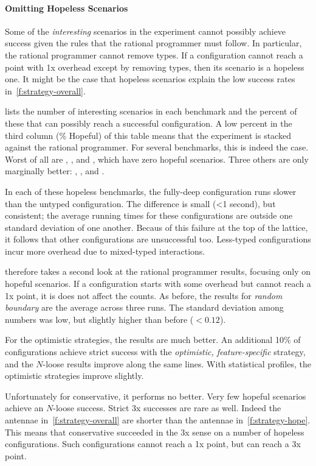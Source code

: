 \paragraph{Omitting Hopeless Scenarios}

Some of the \emph{interesting} scenarios in the experiment cannot possibly
achieve success given the rules that the rational programmer must follow.
In particular, the rational programmer cannot remove types.
If a configuration cannot reach a point with 1x overhead except by removing
types, then its scenario is a hopeless one.
It might be the case that hopeless scenarios explain the low success rates
in~\cref{f:strategy-overall}.

 lists the number of interesting scenarios in each benchmark
and the percent of these that can possibly reach a successful configuration.
A low percent in the third column (\% Hopeful) of this table means that
the experiment is stacked against the rational programmer.
For several benchmarks, this is indeed the case.
Worst of all are , , and ,
which have zero hopeful scenarios.
Three others are only marginally better: , , and
.

In each of these hopeless benchmarks, the fully-deep configuration runs
slower than the untyped configuration.
The difference is small (<1 second), but consistent;
the average running times for these configurations are outside one standard
deviation of one another.
Becaus of this failure at the top of the lattice, it follows that other
configurations are unsuccessful too.
Less-typed configurations incur more overhead due to mixed-typed interactions.

 therefore takes a second look at the rational programmer
results, focusing only on hopeful scenarios.
If a configuration starts with some overhead but cannot reach a 1x point, it
is does not affect the counts.
As before, the results for \emph{random boundary} are the average across three
runs.
The standard deviation among numbers was low, but slightly higher than before ($<0.12$).

For the optimistic strategies, the results are much better.
An additional 10\% of configurations achieve strict success
with the \emph{optimistic, feature-specific} strategy, and
the $N$-loose results improve along the same lines.
With statistical profiles, the optimistic strategies improve
slightly.

Unfortunately for conservative, it performs no better.
Very few hopeful scenarios achieve an $N$-loose success.
Strict 3x successes are rare as well.
Indeed the antennae in~\cref{f:strategy-overall} are shorter than the
antennae in~\cref{f:strategy-hope}.
This means that conservative succeeded in the 3x sense on a number
of hopeless configurations. Such configurations cannot reach a 1x
point, but can reach a 3x point.


